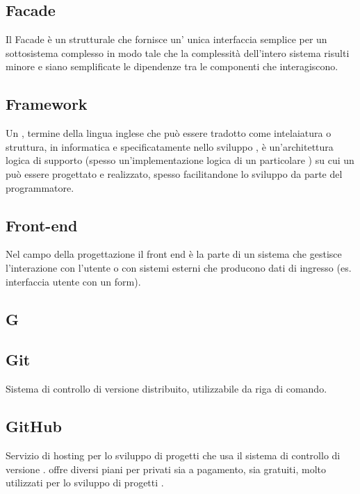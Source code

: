 \subsection{Facade}
Il Facade è un  strutturale che fornisce un' unica interfaccia semplice per un sottosistema complesso in modo tale che la complessità dell'intero sistema risulti minore e siano
semplificate le dipendenze tra le componenti che interagiscono.

\subsection{Framework}
Un , termine della lingua inglese che può essere tradotto come intelaiatura o struttura, in informatica e specificatamente nello sviluppo , è un'architettura logica di supporto (spesso un'implementazione logica di un particolare ) su cui un  può essere progettato e realizzato, spesso facilitandone lo sviluppo da parte del programmatore.

\subsection{Front-end}
Nel campo della progettazione  il front end è la parte di un sistema  che gestisce l'interazione con l'utente o con sistemi esterni che producono dati di ingresso (es. interfaccia utente con un form).

\newpage

\begin{center}
\Huge\section{\uppercase{G}}
\end{center}

\subsection{Git}
Sistema  di controllo di versione distribuito, utilizzabile da riga di comando.

\subsection{GitHub}
Servizio  di hosting per lo sviluppo di progetti  che usa il sistema di controllo
di versione  .  offre diversi piani per  privati sia a pagamento, sia
gratuiti, molto utilizzati per lo sviluppo di progetti .

